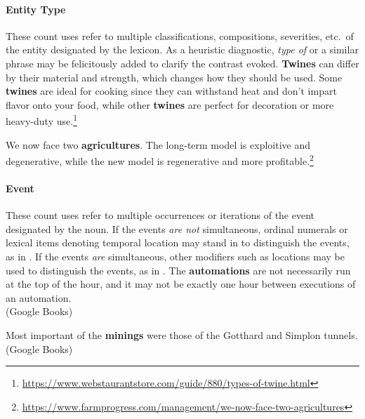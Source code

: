 \documentclass[output=paper]{langscibook}
\begin{document}
\paragraph*{Entity Type} These count uses refer to multiple classifications, compositions, severities, etc.\ of the entity designated by the lexicon. As a heuristic diagnostic, \emph{type of} or a similar phrase may be felicitously added to clarify the contrast evoked.
\eanoraggedright \label{gri-ric:ex:twines}
\textbf{Twines} can differ by their material and strength, which changes how they should be used. Some \textbf{twines} are ideal for cooking since they can withstand heat and don’t impart flavor onto your food, while other \textbf{twines} are perfect for decoration or more heavy-duty use.\footnote{\url{https://www.webstaurantstore.com/guide/880/types-of-twine.html}} \z

\eanoraggedright \label{gri-ric:ex:agricultures} We now face two \textbf{agricultures}. The long-term model is exploitive and degenerative, while the new model is regenerative and more profitable.\footnote{\url{https://www.farmprogress.com/management/we-now-face-two-agricultures}} \z



\paragraph*{Event} These count uses refer to multiple occurrences or iterations of the event designated by the noun. If the events \textit{are not} simultaneous, ordinal numerals or lexical items denoting temporal location may stand in to distinguish the events, as in  . %
If the events \textit{are} simultaneous, other modifiers such as locations may be used to distinguish the events, as in .
\eanoraggedright \label{gri-ric:ex:automations}
The \textbf{automations} are not necessarily run at the top of the hour, and it may not be exactly one hour between executions of an automation.\\\null\hfill (Google Books) 
\z 

\eanoraggedright \label{gri-ric:ex:minings}
Most important of the \textbf{minings} were those of the Gotthard and Simplon tunnels. \hfill (Google Books)
\z
\end{document}
